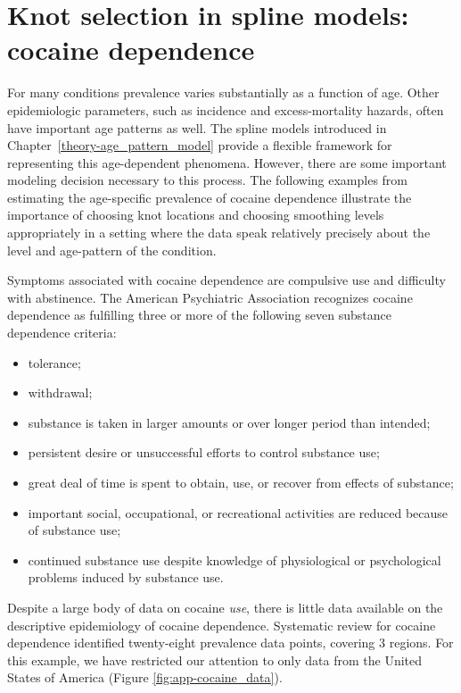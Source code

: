 \chapter{Knot selection in spline models: cocaine dependence}
\label{applications-splines_knot_loc}

For many conditions prevalence varies substantially as a function of
age.  Other epidemiologic parameters, such as incidence and
excess-mortality hazards, often have important age patterns as well.
The spline models introduced in Chapter~\ref{theory-age_pattern_model}
provide a flexible framework for representing this age-dependent
phenomena.  However, there are some important modeling decision
necessary to this process.  The following examples from estimating the
age-specific prevalence of cocaine dependence illustrate the
importance of choosing knot locations and choosing smoothing levels
appropriately in a setting where the data speak relatively precisely
about the level and age-pattern of the condition.

Symptoms associated with cocaine dependence are compulsive use and
difficulty with abstinence.  The American Psychiatric Association
recognizes cocaine dependence as fulfilling three or more of the
following seven substance dependence criteria: \cite{american_diagnostic_2000, wagner_first_2002}
    \begin{itemize} \label{page:app-substance_dependence}
        \item tolerance;
        \item withdrawal;
        \item substance is taken in larger amounts or over longer
          period than intended;
        \item persistent desire or unsuccessful efforts to control
          substance use;
        \item great deal of time is spent to obtain, use, or recover
          from effects of substance;
        \item important social, occupational, or recreational
          activities are reduced because of substance use;
        \item continued substance use despite knowledge of
          physiological or psychological problems induced by substance
          use.
    \end{itemize}

Despite a large body of data on cocaine \emph{use}, there is little
data available on the descriptive epidemiology of cocaine
dependence.\cite{degenhardt_what_2011} Systematic review for cocaine
dependence identified twenty-eight prevalence data points,
covering 3 regions.  For this example, we have restricted our attention
to only data from the United States of America (Figure \ref{fig:app-cocaine_data}).

